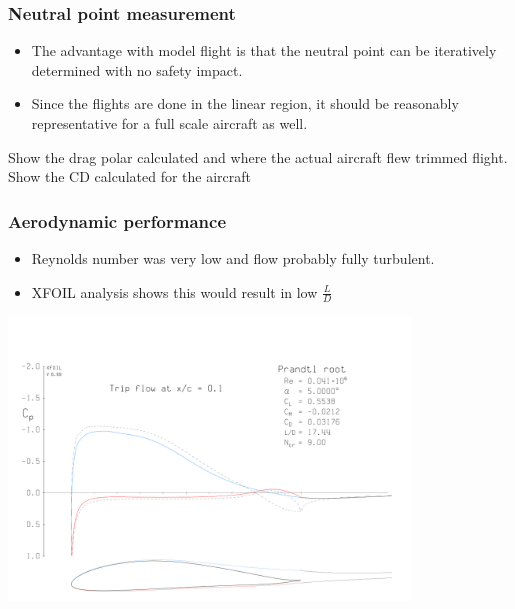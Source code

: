 \documentclass{beamer}
\begin{document}
\begin{frame}
\frametitle{Neutral point measurement}

\begin{itemize}
\item The advantage with model flight is that the neutral point can be iteratively determined with no safety impact.
\item Since the flights are done in the linear region, it should be reasonably representative for a full scale aircraft as well.
\end{itemize}

Show the drag polar calculated and where the actual aircraft flew trimmed flight.
Show the CD calculated for the aircraft

\end{frame}



\begin{frame}
\frametitle{Aerodynamic performance}

\begin{itemize}
\item Reynolds number was very low and flow probably fully turbulent.
\item XFOIL analysis shows this would result in low $\frac{L}{D}$
\end{itemize}


\includegraphics[width = 0.8\textwidth]{Pictures/PrandtlRoot5alhpa.png}

\end{frame}
\end{document}
